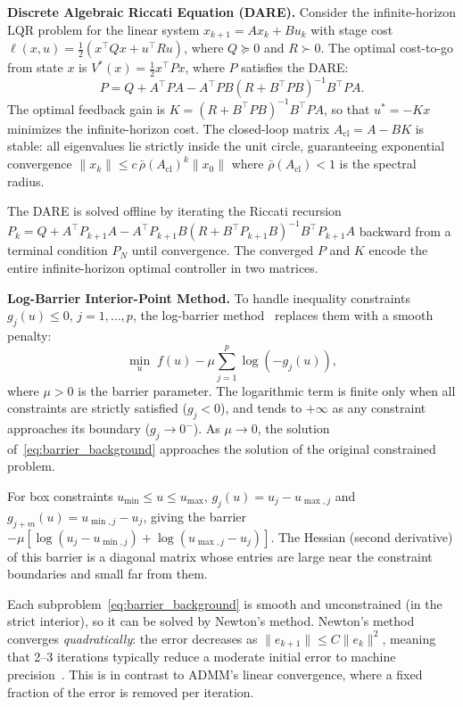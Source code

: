 \textbf{Discrete Algebraic Riccati Equation (DARE).}
Consider the infinite-horizon LQR problem for the linear
system $x_{k+1} = A x_k + B u_k$ with stage cost
$\ell(x,u) = \frac{1}{2}(x^\top Q x + u^\top R u)$,
where $Q \succeq 0$ and $R \succ 0$.
The optimal cost-to-go from state $x$ is
$V^*(x) = \frac{1}{2} x^\top P x$,
where $P$ satisfies the DARE:
\begin{equation}\label{eq:dare_background}
  P = Q + A^\top P A
  - A^\top P B (R + B^\top P B)^{-1} B^\top P A.
\end{equation}
The optimal feedback gain is
$K = (R + B^\top P B)^{-1} B^\top P A$,
so that $u^* = -K x$ minimizes the infinite-horizon cost.
The closed-loop matrix $A_{\mathrm{cl}} = A - BK$ is stable:
all eigenvalues lie strictly inside the unit circle,
guaranteeing exponential convergence
$\|x_k\| \leq c \, \bar\rho(A_{\mathrm{cl}})^k \|x_0\|$
where $\bar\rho(A_{\mathrm{cl}}) < 1$ is the spectral radius.

The DARE is solved offline by iterating the Riccati recursion
$P_{k} = Q + A^\top P_{k+1} A - A^\top P_{k+1} B
(R + B^\top P_{k+1} B)^{-1} B^\top P_{k+1} A$
backward from a terminal condition $P_N$ until convergence.
The converged $P$ and $K$ encode the entire infinite-horizon
optimal controller in two matrices.

\textbf{Log-Barrier Interior-Point Method.}
To handle inequality constraints
$g_j(u) \leq 0$, $j = 1, \ldots, p$,
the log-barrier method~\cite{boyd2004} replaces them with
a smooth penalty:
\begin{equation}\label{eq:barrier_background}
  \min_u \; f(u) - \mu \sum_{j=1}^{p} \log(-g_j(u)),
\end{equation}
where $\mu > 0$ is the barrier parameter.
The logarithmic term is finite only when all constraints
are strictly satisfied ($g_j < 0$), and tends to $+\infty$
as any constraint approaches its boundary ($g_j \to 0^-$).
As $\mu \to 0$, the solution of~\eqref{eq:barrier_background}
approaches the solution of the original constrained problem.

For box constraints $u_{\min} \leq u \leq u_{\max}$,
$g_j(u) = u_j - u_{\max,j}$ and
$g_{j+m}(u) = u_{\min,j} - u_j$,
giving the barrier
$-\mu[\log(u_j - u_{\min,j}) + \log(u_{\max,j} - u_j)]$.
The Hessian (second derivative) of this barrier is a
diagonal matrix whose entries are large near the constraint
boundaries and small far from them.

Each subproblem~\eqref{eq:barrier_background} is smooth
and unconstrained (in the strict interior), so it can be
solved by Newton's method.
Newton's method converges \emph{quadratically}:
the error decreases as $\|e_{k+1}\| \leq C \|e_k\|^2$,
meaning that 2--3 iterations typically reduce a moderate
initial error to machine precision~\cite{boyd2004}.
This is in contrast to ADMM's linear
convergence, where a fixed fraction of the error is removed
per iteration.

